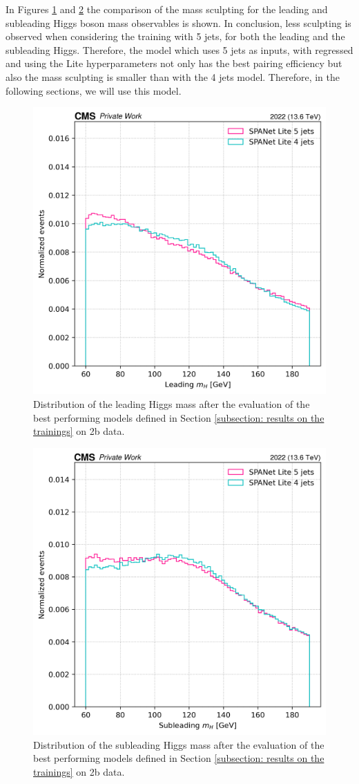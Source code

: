 In Figures \ref{fig: 1D mass sculpting leading} and \ref{fig: 1D mass sculpting subleading} the comparison of the mass sculpting for the leading and subleading Higgs boson mass observables is shown. In conclusion, less sculpting is observed when considering the training with 5 jets, for both the leading and the subleading Higgs. Therefore, the model which uses 5 jets as inputs, with \pt regressed and using the Lite hyperparameters not only has the best pairing efficiency but also the mass sculpting is smaller than with the 4 jets model. Therefore, in the following sections, we will use this model.

\begin{figure}[hbt]
    \centering
    \includegraphics[width=0.6\linewidth]{Images/6.Improving/Mass sculpting/lead h sculpting.png}
    \caption{Distribution of the leading Higgs mass after the evaluation of the best performing models defined in Section \ref{subsection: results on the trainings} on 2b data.}
    \label{fig: 1D mass sculpting leading}
\end{figure}

\begin{figure}[hbt]
    \centering
    \includegraphics[width=0.6\linewidth]{Images/6.Improving/Mass sculpting/subleading h sculpting.png}
    \caption{Distribution of the subleading Higgs mass after the evaluation of the best performing models defined in Section \ref{subsection: results on the trainings} on 2b data.}
    \label{fig: 1D mass sculpting subleading}
\end{figure}

